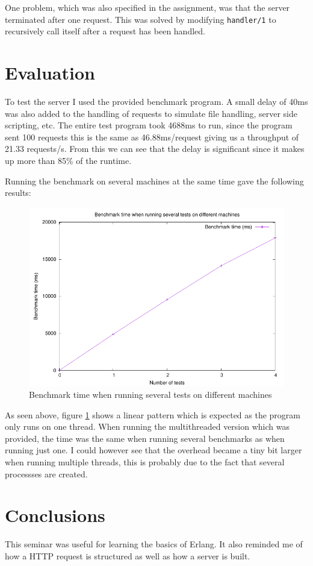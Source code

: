 \documentclass[a4paper, 11pt]{article}
\begin{document}
One problem, which was also specified in the assignment, was that the server terminated after one request. This was solved by modifying \texttt{handler/1} to recursively call itself after a request has been handled.

\section{Evaluation}

To test the server I used the provided benchmark program. A small delay of 40ms was also added to the handling of requests to simulate file handling, server side scripting, etc. The entire test program took 4688ms to run, since the program sent 100 requests this is the same as 46.88ms/request giving us a throughput of 21.33 requests/s. From this we can see that the delay is significant since it makes up more than 85\% of the runtime.

Running the benchmark on several machines at the same time gave the following results:

\begin{figure}[!h]
  \begin{center}
    \includegraphics[width=120mm]{results1.pdf}
    \caption{Benchmark time when running several tests on different machines}
    \label{fig:results1}
  \end{center}
\end{figure}

As seen above, figure \ref{fig:results1} shows a linear pattern which is expected as the program only runs on one thread. When running the multithreaded version which was provided, the time was the same when running several benchmarks as when running just one. I could however see that the overhead became a tiny bit larger when running multiple threads, this is probably due to the fact that several processses are created.

\section{Conclusions}

This seminar was useful for learning the basics of Erlang. It also reminded me of how a HTTP request is structured as well as how a server is built.
\end{document}
